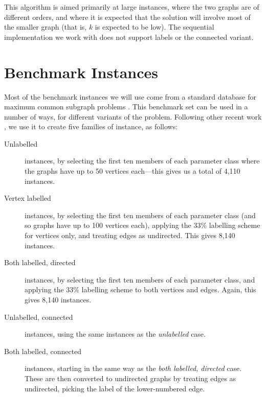 \documentclass{llncs}
\begin{document}
This algorithm is aimed primarily at large instances, where the two graphs are of different orders,
and where it is expected that the solution will involve most of the smaller graph (that is, $k$ is
expected to be low). The sequential implementation we work with does not support labels or the
connected variant.

\section{Benchmark Instances}

Most of the benchmark instances we will use come from a standard database for maximum common
subgraph problems \cite{DBLP:journals/prl/SantoFSV03,DBLP:journals/jgaa/ConteFV07}. This benchmark
set can be used in a number of ways, for different variants of the problem. Following other recent
work \cite{DBLP:conf/cp/McCreeshNPS16,DBLP:conf/aaai/HoffmannMR17,o:McCreeshPT17}, we use it to
create five families of instance, as follows:

\begin{description}
    \item[Unlabelled] instances, by selecting the first ten members of each parameter class where the
        graphs have up to 50 vertices each---this gives us a total of 4,110 instances.

    \item[Vertex labelled] instances, by selecting the first ten members of each parameter class
        (and so graphs have up to 100 vertices each), applying the 33\% labelling scheme for
        vertices only, and treating edges as undirected. This gives 8,140 instances.

    \item[Both labelled, directed] instances, by selecting the first ten members of each parameter
        class, and applying the 33\% labelling scheme to both vertices and edges. Again, this gives
        8,140 instances.

    \item[Unlabelled, connected] instances, using the same instances as the \emph{unlabelled} case.

    \item[Both labelled, connected] instances, starting in the same way as the \emph{both labelled,
        directed} case. These are then converted to undirected graphs by treating edges as
        undirected, picking the label of the lower-numbered edge.
\end{description}
\end{document}
